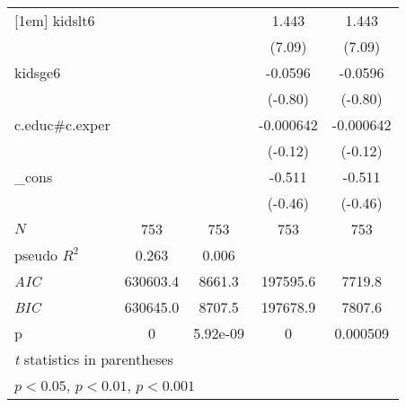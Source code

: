 {\begin{tabular}{l*{4}{c}}
[1em]
kidslt6     &                     &                     &       1.443\sym{***}&       1.443\sym{***}\\
            &                     &                     &      (7.09)         &      (7.09)         \\
[1em]
kidsge6     &                     &                     &     -0.0596         &     -0.0596         \\
            &                     &                     &     (-0.80)         &     (-0.80)         \\
[1em]
c.educ#c.exper&                     &                     &   -0.000642         &   -0.000642         \\
            &                     &                     &     (-0.12)         &     (-0.12)         \\
[1em]
\_cons      &                     &                     &      -0.511         &      -0.511         \\
            &                     &                     &     (-0.46)         &     (-0.46)         \\
\hline
\(N\)       &         753         &         753         &         753         &         753         \\
pseudo \(R^{2}\)&       0.263         &       0.006         &                     &                     \\
\textit{AIC}&    630603.4         &      8661.3         &    197595.6         &      7719.8         \\
\textit{BIC}&    630645.0         &      8707.5         &    197678.9         &      7807.6         \\
p           &           0         &    5.92e-09         &           0         &    0.000509         \\
\hline\hline
\multicolumn{5}{l}{\footnotesize \textit{t} statistics in parentheses}\\
\multicolumn{5}{l}{\footnotesize \sym{*} \(p<0.05\), \sym{**} \(p<0.01\), \sym{***} \(p<0.001\)}\\
\end{tabular}
}
